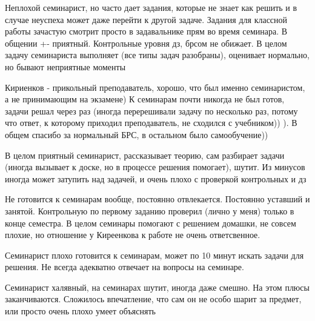             \begin{commentbox} 
                Неплохой семинарист, но часто дает задания, которые не знает как решить и в случае неуспеха может даже перейти к другой задаче. Задания для классной работы зачастую смотрит просто в задавальнике прям во время семинара. В общении +- приятный. Контрольные уровня дз, брсом не обижает. В целом задачу семинариста выполняет (все типы задач разобраны), оценивает нормально, но бывают неприятные моменты 
            \end{commentbox} 
        
            \begin{commentbox} 
                Кириенков - прикольный преподаватель, хорошо, что был именно семинаристом, а не принимающим на экзамене) К семинарам почти никогда не был готов, задачи решал через раз (иногда перерешивали задачу по несколько раз, потому что ответ, к которому приходил преподаватель, не сходился с учебником)) ). В общем спасибо за нормальный БРС, в остальном было самообучение)) 
            \end{commentbox} 
        
            \begin{commentbox} 
                В целом приятный семинарист, рассказывает теорию, сам разбирает задачи (иногда вызывает к доске, но в процессе решения помогает), шутит. Из минусов иногда может затупить над задачей, и очень плохо с проверкой контрольных и дз 
            \end{commentbox} 
        
            \begin{commentbox} 
                Не готовится к семинарам вообще, постоянно отвлекается. Постоянно уставший и занятой. Контрольную по первому заданию проверил (лично у меня) только в конце семестра. В целом семинары помогают с решением домашки, не совсем плохие, но отношение у Киреенкова к работе не очень ответсвенное. 
            \end{commentbox} 
        
            \begin{commentbox} 
                Семинарист плохо готовится к семинарам, может по 10 минут искать задачи для решения. Не всегда адекватно отвечает на вопросы на семинаре.  
            \end{commentbox} 
        
            \begin{commentbox} 
                Семинарист халявный, на семинарах шутит, иногда даже смешно. На этом плюсы заканчиваются. Сложилось впечатление, что сам он не особо шарит за предмет, или просто очень плохо умеет объяснять 
            \end{commentbox} 


